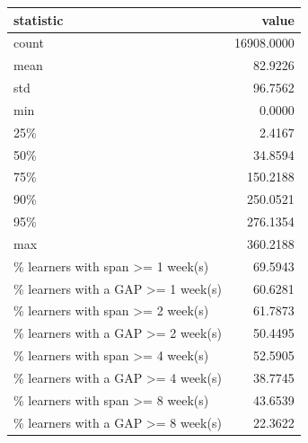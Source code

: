 \begin{tabular}{lr}
\toprule
statistic & value \\
\midrule
count & 16908.0000 \\
mean & 82.9226 \\
std & 96.7562 \\
min & 0.0000 \\
25\% & 2.4167 \\
50\% & 34.8594 \\
75\% & 150.2188 \\
90\% & 250.0521 \\
95\% & 276.1354 \\
max & 360.2188 \\
\% learners with span >= 1 week(s) & 69.5943 \\
\% learners with a GAP >= 1 week(s) & 60.6281 \\
\% learners with span >= 2 week(s) & 61.7873 \\
\% learners with a GAP >= 2 week(s) & 50.4495 \\
\% learners with span >= 4 week(s) & 52.5905 \\
\% learners with a GAP >= 4 week(s) & 38.7745 \\
\% learners with span >= 8 week(s) & 43.6539 \\
\% learners with a GAP >= 8 week(s) & 22.3622 \\
\bottomrule
\end{tabular}
